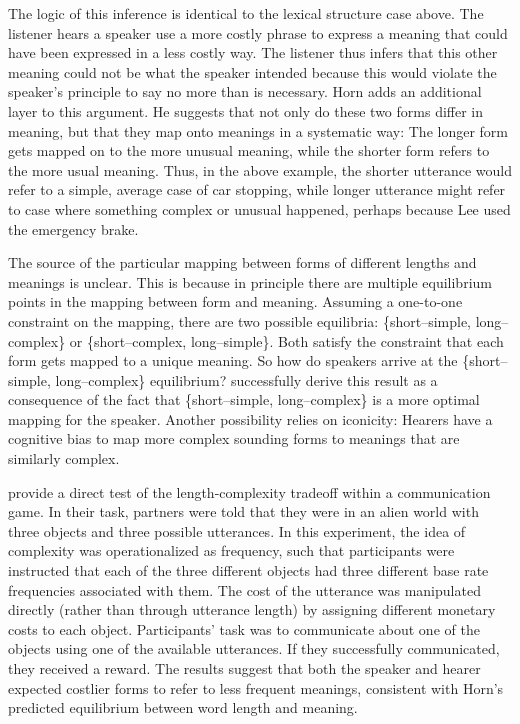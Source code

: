 The logic of this inference is identical to the lexical structure case above. The listener hears a speaker use a more costly phrase to express a meaning that could have been expressed in a less costly way. The listener thus infers that this other meaning could not be what the speaker intended because this would violate the speaker's principle to say no more than is necessary. Horn adds an additional layer to this argument. He suggests that not only do these two forms differ in meaning, but that they map onto meanings in a systematic way: The longer form gets mapped on to the more unusual meaning, while the shorter form refers to the more usual meaning. Thus, in the above example, the shorter utterance would refer to a simple, average case of car stopping, while longer utterance might refer to case where something complex or unusual happened, perhaps because Lee used the emergency brake.

The source of the particular mapping between forms of different lengths and meanings is unclear. This is because in principle there are multiple equilibrium points in the mapping between form and meaning. Assuming a one-to-one constraint on the mapping, there are two possible equilibria: \{short--simple, long--complex\} or \{short--complex, long--simple\}. Both satisfy the constraint that each form gets mapped to a unique meaning. So how do speakers arrive at the \{short--simple, long--complex\} equilibrium?  successfully derive this result as a consequence of the fact that \{short--simple, long--complex\} is a more optimal mapping for the speaker. Another possibility relies on iconicity: Hearers have a cognitive bias to map more complex sounding forms to meanings that are similarly complex.

  provide a direct test of the length-complexity tradeoff within a communication game. In their task, partners were told that they were in an alien world with three objects and three possible utterances. In this experiment, the idea of complexity was operationalized as frequency, such that participants were instructed that each of the three different objects had three different base rate frequencies associated with them. The cost of the utterance was manipulated directly (rather than through utterance length) by assigning different monetary costs to each object. Participants' task was to communicate about one of the objects using one of the available utterances. If they successfully communicated, they received a reward. The results suggest that both the speaker and hearer expected costlier forms to refer to less frequent meanings, consistent with Horn's predicted equilibrium between word length and meaning.

